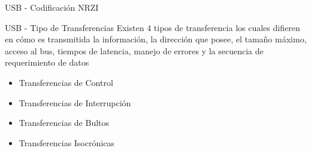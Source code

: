 \documentclass[11pt,a4paper]{beamer}
\newcounter{wavecount}
\newcommand{\newwave}[1]{
	\path (0,\value{wavecount}) node[text width=45,anchor=east,align=right]{#1} node[coordinate](t_cur){};
	\draw (0,\value{wavecount}+.3) --++(.2,0);
	\draw (0,\value{wavecount}-.3) --++(.2,0);
	\path (t_cur) --++(.3,0)node[coordinate](t_cur){};
	\addtocounter{wavecount}{-1}}
\newcommand*{\bit}[2]{
	\draw (t_cur) -- ++(0.1,.6*#1-.3) -- ++(#2-.2,0) -- ++(+.1,.3-.6*#1)
	node[coordinate] (t_cur) {};}
\begin{document}
			\begin{frame}{USB - Codificación NRZI}
				\begin{figure}
				\end{figure}
			\end{frame}
			\begin{frame}{USB - Tipo de Transferencias}
					Existen 4 tipos de transferencia los cuales difieren en cómo es transmitida la información, la dirección que posee, el tamaño máximo, acceso al bus, tiempos de latencia, manejo de errores y la secuencia de requerimiento de datos
				\begin{itemize}
					\item Transferencias de Control
					\item Transferencias de Interrupción
					\item Transferencias de Bultos
					\item Transferencias Isocrónicas
				\end{itemize}
			\end{frame}
\end{document}
